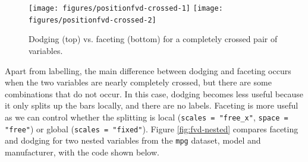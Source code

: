 \begin{figure}

{\centering \texttt{[image: figures/positionfvd-crossed-1]} \texttt{[image: figures/positionfvd-crossed-2]} 

}

\caption{Dodging (top) vs. faceting (bottom) for a completely crossed pair of variables.\label{fig:fvd-crossed}}
\end{figure}

Apart from labelling, the main difference between dodging and faceting
occurs when the two variables are nearly completely crossed, but there
are some combinations that do not occur. In this case, dodging becomes
less useful because it only splits up the bars locally, and there are no
labels. Faceting is more useful as we can control whether the splitting
is local (\texttt{scales = "free\_x"}, \texttt{space = "free"}) or
global (\texttt{scales = "fixed"}). Figure \ref{fig:fvd-nested} compares
faceting and dodging for two nested variables from the \texttt{mpg}
dataset, model and manufacturer, with the code shown below.

\begin{Shaded}
\end{Shaded}


